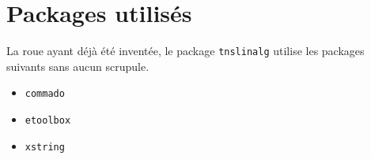 \documentclass[12pt,a4paper]{article}
\begin{document}
\section{Packages utilisés}

La roue ayant déjà été inventée, le package \verb#tnslinalg# utilise les packages suivants sans aucun scrupule.

\begin{multicols}{4}
    \begin{itemize}
        \item \verb#commado#
        \item \verb#etoolbox#
        \item \verb#xstring#
    \end{itemize}
\end{multicols}
\end{document}
